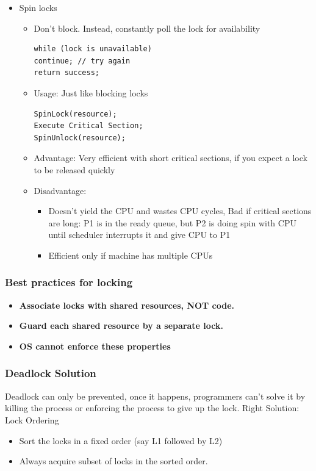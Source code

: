 \documentclass[12pt]{article}
\begin{document}
\begin{itemize}
\begin{itemize}
    \end{itemize}
    \item Spin locks \begin{itemize}
        \item Don’t block. Instead, constantly poll the lock for availability \begin{lstlisting}
while (lock is unavailable) 
continue; // try again
return success;
        \end{lstlisting}
        \item Usage: Just like blocking locks \begin{lstlisting}
SpinLock(resource);
Execute Critical Section;
SpinUnlock(resource);
        \end{lstlisting}
        \item Advantage: Very efficient with short critical sections, if you expect a lock to be released quickly
        \item Disadvantage: \begin{itemize}
            \item Doesn’t yield the CPU and wastes CPU cycles, Bad if critical sections are long: P1 is in the ready queue, but P2 is doing spin with CPU until scheduler interrupts it and give CPU to P1
            \item Efficient only if machine has multiple CPUs
        \end{itemize}
    \end{itemize}
\end{itemize}
\subsubsection{Best practices for locking}
\begin{itemize}
    \item {\bfseries Associate locks with shared resources, NOT code.}
    \item {\bfseries Guard each shared resource by a separate lock.}
    \item {\bfseries OS cannot enforce these properties}
\end{itemize}
\subsubsection{Deadlock Solution}
Deadlock can only be prevented, once it happens, programmers can't solve it by killing the process or enforcing the process to give up the lock.
\newline
Right Solution: Lock Ordering
\begin{itemize}
    \item Sort the locks in a fixed order (say L1 followed by L2) 
    \item Always acquire subset of locks in the sorted order.
\end{itemize}
\end{document}
